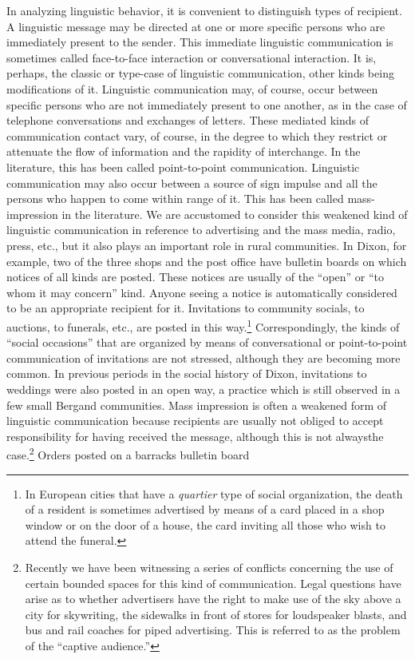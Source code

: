 \documentclass[twoside,symmetric,nobib,justified]{tufte-book}
\begin{document}
In analyzing linguistic behavior, it is convenient to distinguish types
of recipient. A linguistic message may be directed at one or more
specific persons who are immediately present to the sender. This
immediate linguistic communication is sometimes called face-to-face
interaction or conversational interaction. It is, perhaps, the classic
or type-case of linguistic communication, other kinds being
modifications of it. Linguistic communication may, of course, occur
between specific persons who are not immediately present to one another,
as in the case of telephone conversations and exchanges of letters.
These mediated kinds of communication contact vary, of course, in the
degree to which they restrict or attenuate the flow of information and
the rapidity of interchange. In the literature, this has been called
point-to-point communication. Linguistic communication may also occur
between a source of sign impulse and all the persons who happen to come
within range of it. This has been called mass-impression in the
literature. We are accustomed to consider this weakened kind of
linguistic communication in reference to advertising and the mass media,
radio, press, etc., but it also plays an important role in rural
communities. In Dixon, for example, two of the three shops and the post
office have bulletin boards on which notices of all kinds are posted.
These notices are usually of the ``open'' or ``to whom it may concern''
kind. Anyone seeing a notice is automatically considered to be an
appropriate recipient for it. Invitations to community socials, to
auctions, to funerals, etc., are posted in this way.\footnote{In
  European cities that have a \emph{quartier} type of social
  organization, the death of a resident is sometimes advertised by means
  of a card placed in a shop window or on the door of a house, the card
  inviting all those who wish to attend the funeral.} Correspondingly,
the kinds of ``social occasions'' that are organized by means of
conversational or point-to-point communication of invitations are not
stressed, although they are becoming more common. In previous periods in
the social history of Dixon, invitations to weddings were also posted in
an open way, a practice which is still observed in a few small Bergand
communities. Mass impression is often a weakened form of linguistic
communication because recipients are usually not obliged to accept
responsibility for having received the message, although this is not
always\newpage\noindent the case.\footnote{Recently we have been witnessing a series of
  conflicts concerning the use of certain bounded spaces for this kind
  of communication. Legal questions have arise as to whether advertisers
  have the right to make use of the sky above a city for skywriting, the
  sidewalks in front of stores for loudspeaker blasts, and bus and rail
  coaches for piped advertising. This is referred to as the problem of
  the ``captive audience.''} Orders posted on a barracks bulletin board
\end{document}

